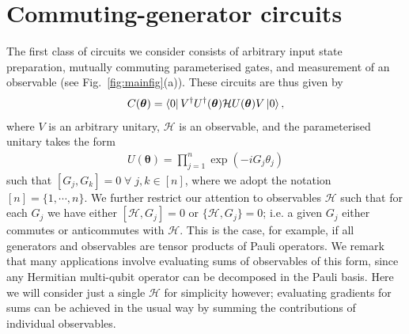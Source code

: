 \documentclass[a4paper,twocolumn,11pt,accepted=2025-09-06]{quantumarticle}
\renewcommand{\vec}{\boldsymbol}
\begin{document}
\section{Commuting-generator circuits}\label{sec:commuting}
The first class of circuits we consider consists of arbitrary input state preparation, mutually commuting parameterised gates, and measurement of an observable (see Fig.\ \ref{fig:mainfig}(a)). These circuits are thus given by 
%
\begin{align}\label{ansatz}
    C(\vec{\theta}) = \bra{0}V^\dagger U^{\dagger}(\vec{\theta})\mathcal{H}U(\vec{\theta}) V\ket{0},
\end{align}
%
where $V$ is an arbitrary unitary, $\mathcal{H}$ is an observable, and the parameterised unitary takes the form 
%
\begin{align}
    U(\vec{\theta})=\prod_{j=1}^n \exp(-iG_j\theta_j)
\end{align}
%
such that $[G_j,G_k]=0\;\forall\;j,k\in[n]$, where we adopt the notation $[n] = \{1,\cdots,n\}$. We further restrict our attention to observables $\mathcal{H}$ such that for each $G_j$ we have either $[\mathcal{H},G_j]=0$ or $\{\mathcal{H},G_j\}=0$; i.e. a given $G_j$ either commutes or anticommutes with $\mathcal{H}$. This is the case, for example, if all generators and observables are tensor products of Pauli operators. We remark that many applications involve evaluating sums of observables of this form, since any Hermitian multi-qubit operator can be decomposed in the Pauli basis. Here we will consider just a single $\mathcal{H}$ for simplicity however; evaluating gradients for sums can be achieved in the usual way by summing the contributions of individual observables. 
\end{document}
